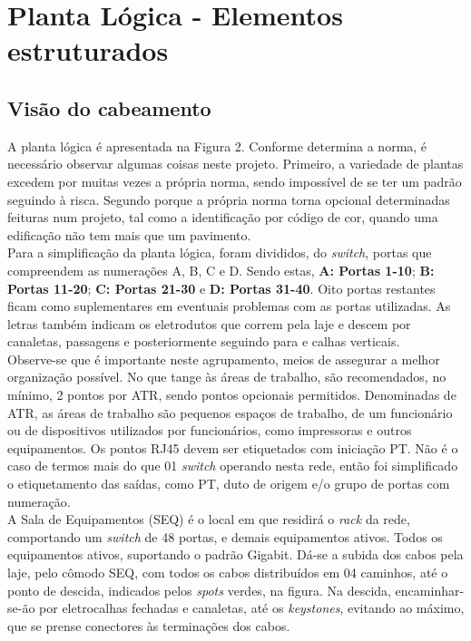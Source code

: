 \documentclass[	DIV=calc,%
							paper=a4,%
							fontsize=12pt,%
							onecolumn]{scrartcl}	 					%
\begin{document}
\section{Planta Lógica - Elementos estruturados}

\subsection{Visão do cabeamento}
A planta lógica é apresentada na Figura 2. Conforme determina a norma, é necessário observar algumas coisas neste projeto. Primeiro, a variedade de plantas excedem por muitas vezes a própria norma, sendo impossível de se ter um padrão seguindo à risca. Segundo porque a própria norma torna opcional determinadas feituras num projeto, tal como a identificação por código de cor, quando uma edificação não tem mais que um pavimento.
\\

Para a simplificação da planta lógica, foram divididos, do \textit{switch}, portas que compreendem as numerações A, B, C e D. Sendo estas, \textbf{A: Portas 1-10}; \textbf{B: Portas 11-20}; \textbf{C: Portas 21-30} e \textbf{D: Portas 31-40}. Oito portas restantes ficam como suplementares em eventuais problemas com as portas utilizadas. As letras também indicam os eletrodutos que correm pela laje e descem por canaletas, passagens e posteriormente seguindo para e calhas verticais. 
\\

Observe-se que é importante neste agrupamento, meios de assegurar a melhor organização possível. No que tange às áreas de trabalho, são recomendados, no mínimo, 2 pontos por ATR, sendo pontos opcionais permitidos. Denominadas de ATR, as áreas de trabalho são pequenos espaços de trabalho, de um funcionário ou de dispositivos utilizados por funcionários, como impressoras e outros equipamentos. Os pontos RJ45 devem ser etiquetados com iniciação PT. Não é o caso de termos mais do que 01 \textit{switch} operando nesta rede, então foi simplificado o etiquetamento das saídas, como PT, duto de origem e/o grupo de portas com numeração.
\\

A Sala de Equipamentos (SEQ) é o local em que residirá o \textit{rack} da rede, comportando um \textit{switch} de 48 portas, e demais equipamentos ativos. Todos os equipamentos ativos, suportando o padrão Gigabit. Dá-se a subida dos cabos pela laje, pelo cômodo SEQ, com todos os cabos distribuídos em 04 caminhos, até o ponto de descida, indicados pelos \textit{spots} verdes, na figura. Na descida, encaminhar-se-ão por eletrocalhas fechadas e canaletas, até os \textit{keystones}, evitando ao máximo, que se prense conectores às terminações dos cabos. 
\\
\end{document}
